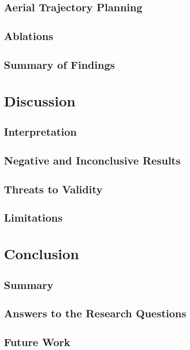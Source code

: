 \documentclass[headsepline,footsepline,footinclude=false,oneside,fontsize=11pt,paper=a4,listof=totoc,bibliography=totoc]{scrbook}
\begin{document}
\section{Aerial Trajectory Planning}\label{sec:res:uav}
\section{Ablations}\label{sec:res:ablations}
\section{Summary of Findings}\label{sec:res:summary}

\chapter{Discussion}\label{ch:discussion}
\section{Interpretation}\label{sec:disc:interpretation}
\section{Negative and Inconclusive Results}\label{sec:disc:negative}
\section{Threats to Validity}\label{sec:disc:threats}
\section{Limitations}\label{sec:disc:limitations}

\chapter{Conclusion}\label{ch:conclusion}
\section{Summary}\label{sec:conc:summary}
\section{Answers to the Research Questions}\label{sec:conc:rqs}
\section{Future Work}\label{sec:conc:future}
\end{document}
